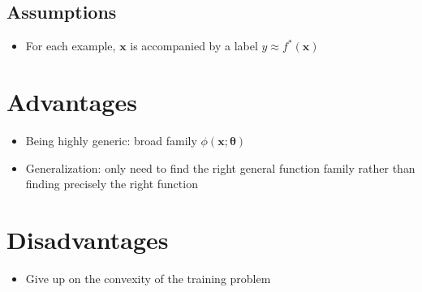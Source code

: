 \documentclass[12pt, a4paper]{article}
\def\vx{\boldsymbol{x}}
\def\vtheta{\boldsymbol{\theta}}
\begin{document}
    \subsection{Assumptions}
    \begin{itemize}
        \item For each example, $\vx$ is accompanied by a label $y \approx f^*(\vx)$
    \end{itemize}


\section{Advantages}

    \begin{itemize}
        \item Being highly generic: broad family $\phi(\vx;\vtheta)$
        \item Generalization: only need to find the right general function family rather than finding precisely the right function
    \end{itemize}


\section{Disadvantages}

    \begin{itemize}
        \item Give up on the convexity of the training problem
    \end{itemize}
\end{document}
